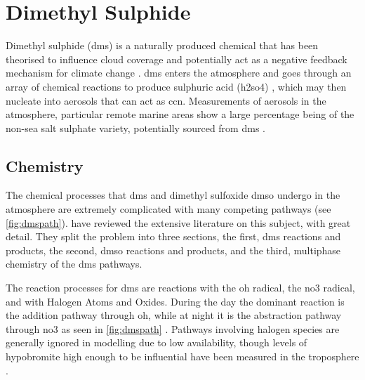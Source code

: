 





\chapter{Dimethyl Sulphide}
\label{ch:dms}

Dimethyl sulphide (\gls{dms}) is a naturally produced chemical that has been theorised to influence cloud coverage and potentially act as a negative feedback mechanism for climate change \citep{charlson:1987fw}. \gls{dms} enters the atmosphere and goes through an array of chemical reactions to produce sulphuric acid (\gls{h2so4}) \citep{barnes:2006ug}, which may then nucleate into aerosols that can act as \gls{ccn}. Measurements of aerosols in the atmosphere, particular remote marine areas show a large percentage being of the non-sea salt sulphate variety, potentially sourced from \gls{dms} \citep{o1997marine}.  


	\section{Chemistry}
	\label{sec:chem}

	The chemical processes that \gls{dms} and dimethyl sulfoxide \gls{dmso} undergo in the atmosphere are extremely complicated with many competing pathways (see \cref{fig:dmspath}). \citet{barnes:2006ug} have reviewed the extensive literature on this subject, with great detail. They split the problem into three sections, the first, \gls{dms} reactions and products, the second, \gls{dmso} reactions and products, and the third, multiphase chemistry of the \gls{dms} pathways.

	The reaction processes for \gls{dms} are reactions with the \gls{oh} radical, the \gls{no3} radical, and with Halogen Atoms and Oxides.  During the day the dominant reaction is the addition pathway through \gls{oh}, while at night it is the abstraction pathway through \gls{no3} as seen in \cref{fig:dmspath} \citep{barnes:2006ug}. Pathways involving halogen species are generally ignored in modelling due to low availability, though levels of hypobromite high enough to be influential have been measured in the troposphere \citep{platt2003role}.


